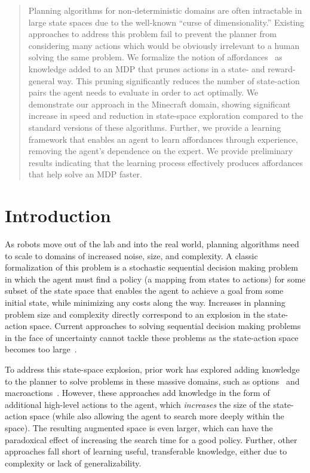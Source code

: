 \documentclass[conference]{IEEEtran}
\begin{document}
\begin{abstract}
Planning algorithms for non-deterministic domains are often
intractable in large state spaces due to the well-known ``curse of
dimensionality.'' Existing approaches to address this problem fail to
prevent the planner from considering many actions which would be
obviously irrelevant to a human solving the same problem.  We
formalize the notion of affordances~\citep{gibson77} as knowledge
added to an MDP that prunes actions in a state- and reward- general
way. This pruning significantly reduces the number of state-action
pairs the agent needs to evaluate in order to act optimally. We
demonstrate our approach in the Minecraft domain, showing significant
increase in speed and reduction in state-space exploration compared to
the standard versions of these algorithms. Further, we provide a
learning framework that enables an agent to learn affordances through
experience, removing the agent's dependence on the expert. We provide
preliminary results indicating that the learning process effectively
produces affordances that help solve an MDP faster.
\end{abstract}

\IEEEpeerreviewmaketitle

\section{Introduction}
\label{sec:introduction}
As robots move out of the lab and into the real world, planning
algorithms need to scale to domains of increased noise, size, and
complexity.  A classic formalization of this problem is a stochastic
sequential decision making problem in which the agent must find a
policy (a mapping from states to actions) for some subset of the state
space that enables the agent to achieve a goal from some initial
state, while minimizing any costs along the way.
Increases in planning problem size and complexity directly correspond
to an explosion in the state-action space. Current approaches to solving 
sequential decision making problems in the face of uncertainty cannot tackle these problems 
as the state-action space becomes too large~\citep{grounds05}.

To address this state-space explosion, prior work has explored adding
knowledge to the planner to solve problems in these
massive domains, such as options~\citep{sutton99} and
macroactions~\citep{Botea:2005kx,Newton:2005vn}. However, these
approaches add knowledge in the form of additional high-level actions
to the agent, which {\em increases} the size of the state-action space
(while also allowing the agent to search more deeply within the
space).  The resulting augmented space is even larger, which can have
the paradoxical effect of increasing the search time for a good
policy. Further, other approaches fall short of learning useful, transferable knowledge,
either due to complexity or lack of generalizability.
\end{document}
